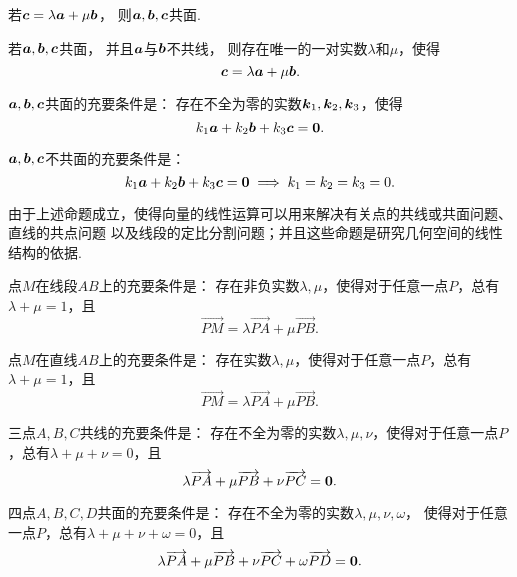 \begin{theorem}
若\(\boldsymbol{c} = \lambda \boldsymbol{a} + \mu \boldsymbol{b}\)，
则\(\boldsymbol{a},\boldsymbol{b},\boldsymbol{c}\)共面.
\end{theorem}

\begin{theorem}
若\(\boldsymbol{a},\boldsymbol{b},\boldsymbol{c}\)共面，
并且\(\boldsymbol{a}\)与\(\boldsymbol{b}\)不共线，
则存在唯一的一对实数\(\lambda\)和\(\mu\)，使得\[
\boldsymbol{c} = \lambda \boldsymbol{a} + \mu \boldsymbol{b}.
\]
\end{theorem}

\begin{theorem}
\(\boldsymbol{a},\boldsymbol{b},\boldsymbol{c}\)共面的充要条件是：
存在不全为零的实数\(\boldsymbol{k}_1,\boldsymbol{k}_2,\boldsymbol{k}_3\)，使得\[
k_1 \boldsymbol{a} + k_2 \boldsymbol{b} + k_3 \boldsymbol{c} = \boldsymbol{0}.
\]
\end{theorem}

\begin{theorem}
\(\boldsymbol{a},\boldsymbol{b},\boldsymbol{c}\)不共面的充要条件是：\[
k_1 \boldsymbol{a} + k_2 \boldsymbol{b} + k_3 \boldsymbol{c} = \boldsymbol{0}
\implies
k_1 = k_2 = k_3 = 0.
\]
\end{theorem}

由于上述命题成立，使得向量的线性运算可以用来解决有关点的共线或共面问题、直线的共点问题
以及线段的定比分割问题；并且这些命题是研究几何空间的线性结构的依据.

\begin{theorem}
点\(M\)在线段\(AB\)上的充要条件是：
存在非负实数\(\lambda,\mu\)，使得对于任意一点\(P\)，总有\(\lambda+\mu=1\)，且\[
\vec{PM} = \lambda \vec{PA} + \mu \vec{PB}.
\]
\end{theorem}

\begin{theorem}
点\(M\)在直线\(AB\)上的充要条件是：
存在实数\(\lambda,\mu\)，使得对于任意一点\(P\)，总有\(\lambda+\mu=1\)，且\[
\vec{PM} = \lambda \vec{PA} + \mu \vec{PB}.
\]
\end{theorem}

\begin{theorem}
三点\(A,B,C\)共线的充要条件是：
存在不全为零的实数\(\lambda,\mu,\nu\)，使得对于任意一点\(P\)，总有\(\lambda+\mu+\nu=0\)，且\[
\lambda \overrightarrow{PA} + \mu \overrightarrow{PB} + \nu \overrightarrow{PC} = \boldsymbol{0}.
\]
\end{theorem}

\begin{theorem}
四点\(A,B,C,D\)共面的充要条件是：
存在不全为零的实数\(\lambda,\mu,\nu,\omega\)，
使得对于任意一点\(P\)，总有\(\lambda+\mu+\nu+\omega=0\)，且\[
\lambda \overrightarrow{PA} + \mu \overrightarrow{PB} + \nu \overrightarrow{PC} + \omega \overrightarrow{PD} = \boldsymbol{0}.
\]
\end{theorem}

